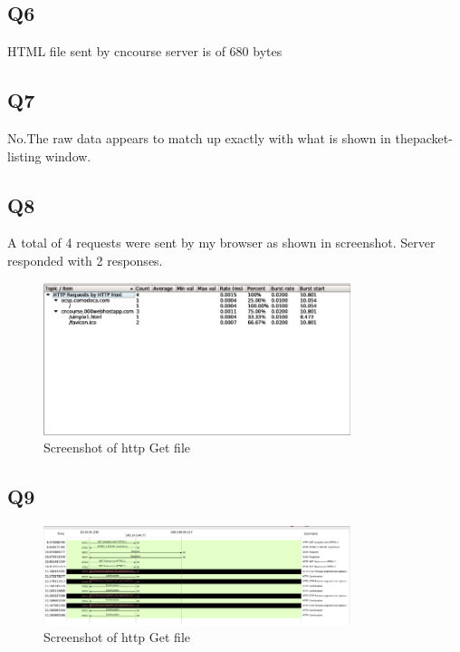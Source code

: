 \documentclass{article}
\begin{document}
\subsection{Q6}
HTML file sent by cncourse server is of 680 bytes\\
\subsection{Q7}
No.The raw data appears to match up exactly with what is shown in thepacket-listing window.\\
\subsection{Q8}
A total of 4 requests were sent by my browser as shown in screenshot. Server responded with 2 responses.\\
  \begin{figure}[H]
 \centering
 \includegraphics[width=0.8\textwidth]{../Set1/q8/a.png}
 \caption{\label{fig:PING}Screenshot of http Get file}
 \end{figure}
\subsection{Q9}
  \begin{figure}[H]
 \centering
 \includegraphics[width=0.8\textwidth]{../Set1/q9/a.png}
 \caption{\label{fig:PING}Screenshot of http Get file}
 \end{figure}
\end{document}

